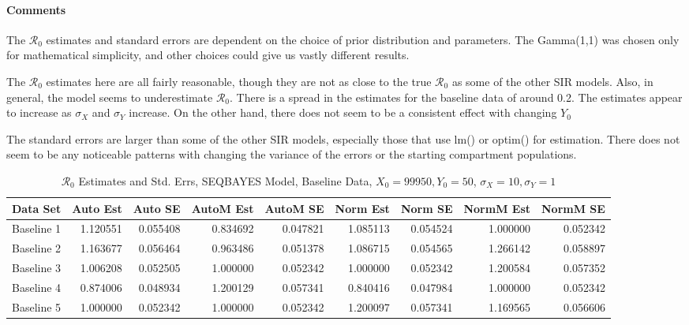 \documentclass[12pt]{article}
\newcommand{\rr}{\ensuremath{\mathcal{R}_0}}
\begin{document}
\paragraph{Comments}

The $\rr$ estimates and standard errors are dependent on the choice of prior distribution and parameters. The Gamma(1,1) was chosen only for mathematical simplicity, and other choices could give us vastly different results. 

The $\rr$ estimates here are all fairly reasonable, though they are not as close to the true $\rr$ as some of the other SIR models. Also, in general, the model seems to underestimate $\rr$. There is a spread in the estimates for the baseline data of around 0.2. The estimates appear to increase as $\sigma_X$ and $\sigma_Y$ increase. On the other hand, there does not seem to be a consistent effect with changing $Y_0$

The standard errors are larger than some of the other SIR models, especially those that use lm() or optim() for estimation. There does not seem to be any noticeable patterns with changing the variance of the errors or the starting compartment populations.

\begin{table}[H]
	
	\caption{$\rr$ Estimates and Std. Errs, SEQBAYES Model, 
		Baseline Data, $X_0 = 99950, Y_0 = 50$, 
		$\sigma_X = 10, \sigma_Y = 1$}
	\begin{footnotesize}
		\hskip -1cm
		\begin{tabular}{l|r|r|r|r|r|r|r|r}
			Data Set & Auto Est & Auto SE & AutoM Est & AutoM SE & Norm Est & Norm SE & NormM Est & NormM SE\\
			\hline
			Baseline 1 & 1.120551 & 0.055408 & 0.834692 & 0.047821 & 1.085113 & 0.054524 & 1.000000 & 0.052342\\
			\hline
			Baseline 2 & 1.163677 & 0.056464 & 0.963486 & 0.051378 & 1.086715 & 0.054565 & 1.266142 & 0.058897\\
			\hline
			Baseline 3 & 1.006208 & 0.052505 & 1.000000 & 0.052342 & 1.000000 & 0.052342 & 1.200584 & 0.057352\\
			\hline
			Baseline 4 & 0.874006 & 0.048934 & 1.200129 & 0.057341 & 0.840416 & 0.047984 & 1.000000 & 0.052342\\
			\hline
			Baseline 5 & 1.000000 & 0.052342 & 1.000000 & 0.052342 & 1.200097 & 0.057341 & 1.169565 & 0.056606\\
			\hline
		\end{tabular}
	\end{footnotesize}
\end{table}
\end{document}
